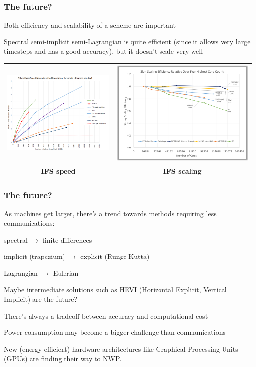 \documentclass[aspectratio=43,9pt]{beamer}
\begin{document}
\begin{frame}
	\frametitle{The future?}
	\begin{myitemize}{3ex}
		\item Both efficiency and scalability of a scheme are important
		\item Spectral semi-implicit semi-Lagrangian is quite efficient (since it allows very large timesteps and has a good accuracy), but it doesn't scale very well
	\end{myitemize}
	\begin{center}
		\begin{tabular}{cc}
			\includegraphics[width=.45\textwidth]{IFS_speed}	& \includegraphics[width=.45\textwidth]{IFS_scaling}	\\
			\textbf{IFS speed}	&	\textbf{IFS scaling}
		\end{tabular}
	\end{center}
\end{frame}
%
%
\begin{frame}
	\frametitle{The future?}
	\begin{myitemize}{3ex}
		\item As machines get larger, there's a trend towards methods requiring less communications:
			\begin{myitemize}{1ex}
				\item spectral $\rightarrow$ finite differences
				\item implicit (trapezium) $\rightarrow$ explicit (Runge-Kutta)
				\item Lagrangian $\rightarrow$ Eulerian
			\end{myitemize}
		\item Maybe intermediate solutions such as HEVI (Horizontal Explicit, Vertical Implicit) are the future?
		\item There's always a tradeoff between accuracy and computational cost
		\item Power consumption may become a bigger challenge than communications
		\item New (energy-efficient) hardware architectures like Graphical Processing Units (GPUs) are finding their way to NWP.
	\end{myitemize}
\end{frame}
%
%
\end{document}

